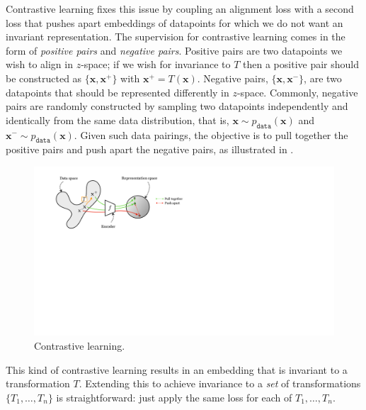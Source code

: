 Contrastive learning fixes this issue by coupling an alignment loss with a second loss that pushes apart embeddings of datapoints for which we do not want an invariant representation. The supervision for contrastive learning comes in the form of \textit{positive pairs} and \textit{negative pairs}. Positive pairs are two datapoints we wish to align in $z$-space; if we wish for invariance to $T$ then a positive pair should be constructed as $\{\mathbf{x}, \mathbf{x}^{+}\}$ with $\mathbf{x}^{+} = T(\mathbf{x})$. Negative pairs, $\{\mathbf{x},\mathbf{x}^-\}$, are two datapoints that should be represented differently in $z$-space. Commonly, negative pairs are randomly constructed by sampling two datapoints independently and identically from the same data distribution, that is, $\mathbf{x} \sim p_{\texttt{data}}(\mathbf{x})$ and $\mathbf{x}^{-} \sim p_{\texttt{data}}(\mathbf{x})$. Given such data pairings, the objective is to pull together the positive pairs and push apart the negative pairs, as illustrated in \fig{\ref{fig:representation_learning:contrastive_learning_diagram}}.
\begin{figure}[h!]
    \centerline{
        \includegraphics[width=0.75\linewidth]{figures/representation_learning/contrastive_learning_diagram.pdf}
    }
    \caption{Contrastive learning.}
    \label{fig:representation_learning:contrastive_learning_diagram}
\end{figure}

This kind of contrastive learning results in an embedding that is invariant to a transformation $T$. Extending this to achieve invariance to a \textit{set} of transformations $\{T_1, \ldots, T_n\}$ is straightforward: just apply the same loss for each of $T_1, \ldots, T_n$.

